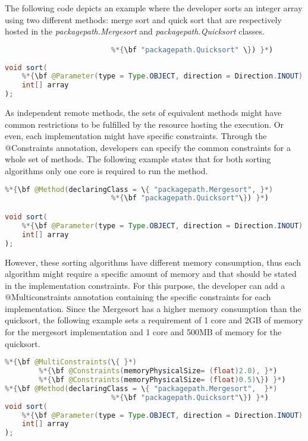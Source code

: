 The following code depicts an example where the developer sorts an integer array using two different
methods: merge sort and quick sort that are respectively hosted in the {\it packagepath.Mergesort} and
{\it packagepath.Quicksort} classes.

\begin{lstlisting}[language=java]
%*{\bf @Method(declaringClass = \{ "packagepath.Mergesort", }*)
                         %*{\bf "packagepath.Quicksort" \}) }*)
                           
void sort(
    %*{\bf @Parameter(type = Type.OBJECT, direction = Direction.INOUT) }*)
    int[] array
);
\end{lstlisting}

As independent remote methods, the sets of equivalent methods might have common restrictions to be
fulfilled by the resource hosting the execution. Or even, each implementation might have specific constraints.
Through the @Constraints annotation, developers can specify the common constraints for a whole set of
methods. The following example states that for both sorting algorithms only one core is required to run the
method.

\begin{lstlisting}[language=java]
%*{\bf @Constraints(processorCoreCount = 1) }*)
%*{\bf @Method(declaringClass = \{ "packagepath.Mergesort", }*) 
                         %*{\bf "packagepath.Quicksort"\}) }*)

void sort(
    %*{\bf @Parameter(type = Type.OBJECT, direction = Direction.INOUT) }*)
    int[] array
);
\end{lstlisting}

However, these sorting algorithms have different memory consumption, thus each algorithm might require a
specific amount of memory and that should be stated in the implementation constraints. For this purpose, the
developer can add a @Multiconstraints annotation containing the specific constraints for each
implementation. Since the Mergesort has a higher memory consumption than the quicksort, the following
example sets a requirement of 1 core and 2GB of memory for the mergesort implementation and 1 core and
500MB of memory for the quicksort.

\begin{lstlisting}[language=java]
%*{\bf @Constraints(processorCoreCount = 1) }*)
%*{\bf @MultiConstraints(\{ }*)
        %*{\bf @Constraints(memoryPhysicalSize= (float)2.0), }*)
        %*{\bf @Constraints(memoryPhysicalSize= (float)0.5)\}) }*)
%*{\bf @Method(declaringClass = \{ "packagepath.Mergesort",  }*)
                         %*{\bf "packagepath.Quicksort"\}) }*)
void sort(
    %*{\bf @Parameter(type = Type.OBJECT, direction = Direction.INOUT) }*)
    int[] array
);
\end{lstlisting}

